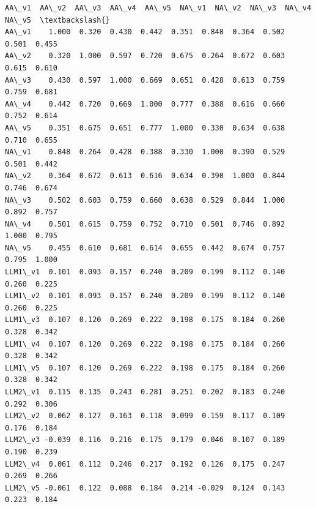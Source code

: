 \documentclass[11pt]{article}
\makeatletter
\newcommand{\boxspacing}{\kern\kvtcb@left@rule\kern\kvtcb@boxsep}
\newcommand{\prompt}[4]{
        {\ttfamily\llap{{\color{#2}[#3]:\hspace{3pt}#4}}\vspace{-\baselineskip}}
    }
\makeatother
\begin{document}
            \begin{tcolorbox}[breakable, size=fbox, boxrule=.5pt, pad at break*=1mm, opacityfill=0]
\prompt{Out}{outcolor}{46}{\boxspacing}
\begin{Verbatim}[commandchars=\\\{\}]
         AA\_v1  AA\_v2  AA\_v3  AA\_v4  AA\_v5  NA\_v1  NA\_v2  NA\_v3  NA\_v4  NA\_v5  \textbackslash{}
AA\_v1    1.000  0.320  0.430  0.442  0.351  0.848  0.364  0.502  0.501  0.455
AA\_v2    0.320  1.000  0.597  0.720  0.675  0.264  0.672  0.603  0.615  0.610
AA\_v3    0.430  0.597  1.000  0.669  0.651  0.428  0.613  0.759  0.759  0.681
AA\_v4    0.442  0.720  0.669  1.000  0.777  0.388  0.616  0.660  0.752  0.614
AA\_v5    0.351  0.675  0.651  0.777  1.000  0.330  0.634  0.638  0.710  0.655
NA\_v1    0.848  0.264  0.428  0.388  0.330  1.000  0.390  0.529  0.501  0.442
NA\_v2    0.364  0.672  0.613  0.616  0.634  0.390  1.000  0.844  0.746  0.674
NA\_v3    0.502  0.603  0.759  0.660  0.638  0.529  0.844  1.000  0.892  0.757
NA\_v4    0.501  0.615  0.759  0.752  0.710  0.501  0.746  0.892  1.000  0.795
NA\_v5    0.455  0.610  0.681  0.614  0.655  0.442  0.674  0.757  0.795  1.000
LLM1\_v1  0.101  0.093  0.157  0.240  0.209  0.199  0.112  0.140  0.260  0.225
LLM1\_v2  0.101  0.093  0.157  0.240  0.209  0.199  0.112  0.140  0.260  0.225
LLM1\_v3  0.107  0.120  0.269  0.222  0.198  0.175  0.184  0.260  0.328  0.342
LLM1\_v4  0.107  0.120  0.269  0.222  0.198  0.175  0.184  0.260  0.328  0.342
LLM1\_v5  0.107  0.120  0.269  0.222  0.198  0.175  0.184  0.260  0.328  0.342
LLM2\_v1  0.115  0.135  0.243  0.281  0.251  0.202  0.183  0.240  0.292  0.306
LLM2\_v2  0.062  0.127  0.163  0.118  0.099  0.159  0.117  0.109  0.176  0.184
LLM2\_v3 -0.039  0.116  0.216  0.175  0.179  0.046  0.107  0.189  0.190  0.239
LLM2\_v4  0.061  0.112  0.246  0.217  0.192  0.126  0.175  0.247  0.269  0.266
LLM2\_v5 -0.061  0.122  0.088  0.184  0.214 -0.029  0.124  0.143  0.223  0.184


\end{Verbatim}
\end{tcolorbox}
\end{document}
